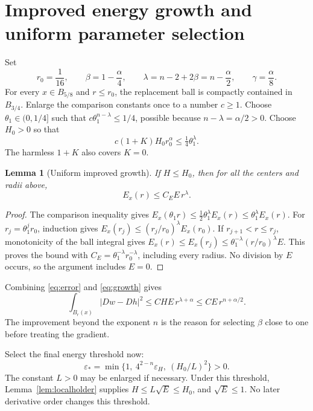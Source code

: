 \documentclass[11pt,a4paper]{article}
\numberwithin{equation}{section}
\newtheorem{lemma}[theorem]{Lemma}
\theoremstyle{definition}
\theoremstyle{remark}
\begin{document}
\section{Improved energy growth and uniform parameter selection}
\label{sec:growth}

Set
\begin{equation}\label{eq:parameters}
 r_0=\frac1{16},\qquad \beta=1-\frac\alpha4,\qquad
 \lambda=n-2+2\beta=n-\frac\alpha2,\qquad
 \gamma=\frac\alpha8.
\end{equation}
For every \(x\in B_{5/8}\) and \(r\le r_0\), the replacement ball is
compactly contained in \(B_{3/4}\). Enlarge the comparison constants once
to a number \(c\ge1\). Choose \(\theta_1\in(0,1/4]\) such that
\(c\theta_1^{n-\lambda}\le1/4\), possible because
\(n-\lambda=\alpha/2>0\). Choose \(H_0>0\) so that
\begin{equation}\label{eq:smallholder}
 c(1+K)H_0r_0^\alpha\le\tfrac14\theta_1^\lambda.
\end{equation}
The harmless \(1+K\) also covers \(K=0\).

\begin{lemma}[Uniform improved growth]
\label{lem:growth}
If \(H\le H_0\), then for all the centers and radii above,
\begin{equation}\label{eq:growth}
 E_x(r)\le C_E E\,r^\lambda.
\end{equation}
\end{lemma}
\begin{proof}
The comparison inequality gives
\(E_x(\theta_1r)\le\tfrac12\theta_1^\lambda E_x(r)
\le\theta_1^\lambda E_x(r)\).
For \(r_j=\theta_1^jr_0\), induction gives
\(E_x(r_j)\le(r_j/r_0)^\lambda E_x(r_0)\).
If \(r_{j+1}<r\le r_j\), monotonicity of the ball integral gives
\(E_x(r)\le E_x(r_j)\le\theta_1^{-\lambda}(r/r_0)^\lambda E\).
This proves the bound with
\(C_E=\theta_1^{-\lambda}r_0^{-\lambda}\), including every radius.
No division by \(E\) occurs, so the argument includes \(E=0\).
\end{proof}

Combining \eqref{eq:error} and \eqref{eq:growth} gives
\begin{equation}\label{eq:bettererror}
 \int_{B_r(x)}|Dw-Dh|^2
 \le C H E\,r^{\lambda+\alpha}
 \le C E\,r^{n+\alpha/2}.
\end{equation}
The improvement beyond the exponent \(n\) is the reason for selecting
\(\beta\) close to one before treating the gradient.

Select the final energy threshold now:
\begin{equation}\label{eq:threshold}
 \varepsilon_*=
 \min\{1,\ 4^{2-n}\varepsilon_H,\ (H_0/L)^2\}>0.
\end{equation}
The constant \(L>0\) may be enlarged if necessary. Under this threshold,
Lemma~\ref{lem:localholder} supplies \(H\le L\sqrt E\le H_0\), and
\(\sqrt E\le1\). No later derivative order changes this threshold.
\end{document}
